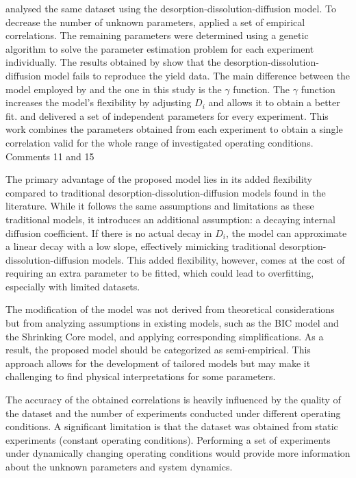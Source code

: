 \documentclass[a4paper,fleqn]{cas-dc}
\begin{document}
\citet{Rahimi2011} analysed the same dataset using the desorption-dissolution-diffusion model. To decrease the number of unknown parameters, \citet{Rahimi2011} applied a set of empirical correlations. The remaining parameters were determined using a genetic algorithm to solve the parameter estimation problem for each experiment individually. The results obtained by \citet{Rahimi2011} show that the desorption-dissolution-diffusion model fails to reproduce the yield data. The main difference between the model employed by \citet{Rahimi2011} and the one in this study is the $\gamma$ function. The $\gamma$ function increases the model's flexibility by adjusting $D_i$ and allows it to obtain a better fit. \citet{Povh2001} and \citet{Rahimi2011} delivered a set of independent parameters for every experiment. This work combines the parameters obtained from each experiment to obtain a single correlation valid for the whole range of investigated operating conditions.\\
{\color{red}Comments 11 and 15} {\color{blue}The primary advantage of the proposed model lies in its added flexibility compared to traditional desorption-dissolution-diffusion models found in the literature. While it follows the same assumptions and limitations as these traditional models, it introduces an additional assumption: a decaying internal diffusion coefficient. If there is no actual decay in \(D_i\), the model can approximate a linear decay with a low slope, effectively mimicking traditional desorption-dissolution-diffusion models. This added flexibility, however, comes at the cost of requiring an extra parameter to be fitted, which could lead to overfitting, especially with limited datasets.
	
The modification of the model was not derived from theoretical considerations but from analyzing assumptions in existing models, such as the BIC model and the Shrinking Core model, and applying corresponding simplifications. As a result, the proposed model should be categorized as semi-empirical. This approach allows for the development of tailored models but may make it challenging to find physical interpretations for some parameters.
	
The accuracy of the obtained correlations is heavily influenced by the quality of the dataset and the number of experiments conducted under different operating conditions. A significant limitation is that the dataset was obtained from static experiments (constant operating conditions). Performing a set of experiments under dynamically changing operating conditions would provide more information about the unknown parameters and system dynamics.}
\end{document}
